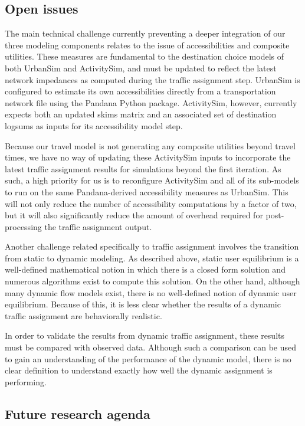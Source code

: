 \subsection{Open issues}

The main technical challenge currently preventing a deeper integration of our three modeling components relates to the issue of accessibilities and composite utilities. These measures are fundamental to the destination choice models of both UrbanSim and ActivitySim, and must be updated to reflect the latest network impedances as computed during the traffic assignment step. UrbanSim is configured to estimate its own accessibilities directly from a transportation network file using the Pandana Python package. ActivitySim, however, currently expects both an updated skims matrix and an associated set of destination logsums as inputs for its accessibility model step.

Because our travel model is not generating any composite utilities beyond travel times, we have no way of updating these ActivitySim inputs to incorporate the latest traffic assignment results for simulations beyond the first iteration. As such, a high priority for us is to reconfigure ActivitySim and all of its sub-models to run on the same Pandana-derived accessibility measures as UrbanSim. This will not only reduce the number of accessibility computations by a factor of two, but it will also significantly reduce the amount of overhead required for post-processing the traffic assignment output.

Another challenge related specifically to traffic assignment involves the transition from static to dynamic modeling. As described above, static user equilibrium is a well-defined mathematical notion in which there is a closed form solution and numerous algorithms exist to compute this solution. On the other hand, although many dynamic flow models exist, there is no well-defined notion of dynamic user equilibrium. Because of this, it is less clear whether the results of a dynamic traffic assignment are behaviorally realistic.

In order to validate the results from dynamic traffic assignment, these results must be compared with observed data. Although such a comparison can be used to gain an understanding of the performance of the dynamic model, there is no clear definition to understand exactly how well the dynamic assignment is performing. 



\subsection{Future research agenda}

